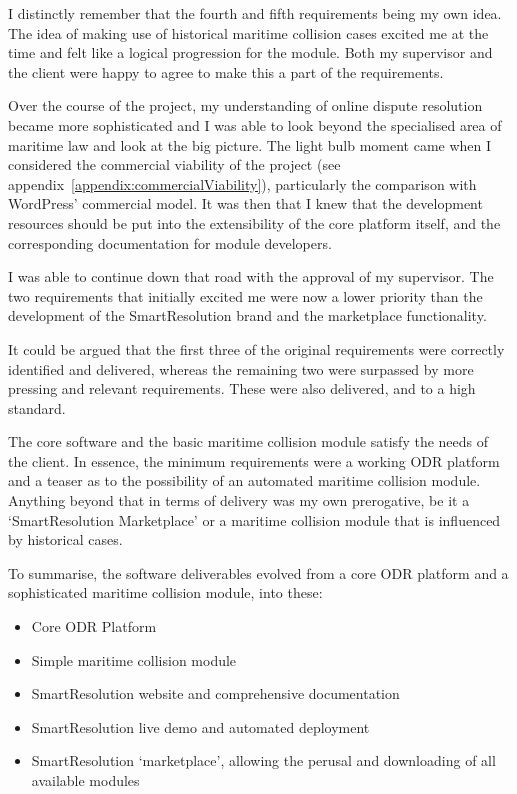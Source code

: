 I distinctly remember that the fourth and fifth requirements being my own idea. The idea of making use of historical maritime collision cases excited me at the time and felt like a logical progression for the module. Both my supervisor and the client were happy to agree to make this a part of the requirements.

Over the course of the project, my understanding of online dispute resolution became more sophisticated and I was able to look beyond the specialised area of maritime law and look at the big picture. The light bulb moment came when I considered the commercial viability of the project (see appendix~\ref{appendix:commercialViability}), particularly the comparison with WordPress' commercial model. It was then that I knew that the development resources should be put into the extensibility of the core platform itself, and the corresponding documentation for module developers.

I was able to continue down that road with the approval of my supervisor. The two requirements that initially excited me were now a lower priority than the development of the SmartResolution brand and the marketplace functionality.

It could be argued that the first three of the original requirements were correctly identified and delivered, whereas the remaining two were surpassed by more pressing and relevant requirements. These were also delivered, and to a high standard.

The core software and the basic maritime collision module satisfy the needs of the client. In essence, the minimum requirements were a working ODR platform and a teaser as to the possibility of an automated maritime collision module. Anything beyond that in terms of delivery was my own prerogative, be it a `SmartResolution Marketplace' or a maritime collision module that is influenced by historical cases.

To summarise, the software deliverables evolved from a core ODR platform and a sophisticated maritime collision module, into these:

\begin{itemize}
\item Core ODR Platform
\item Simple maritime collision module
\item SmartResolution website and comprehensive documentation
\item SmartResolution live demo and automated deployment
\item SmartResolution `marketplace', allowing the perusal and downloading of all available modules
\end{itemize}


